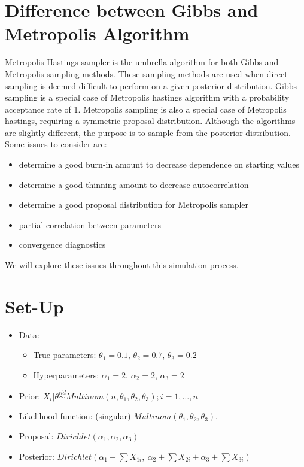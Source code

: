 \documentclass[11pt,a4paper]{article}
\begin{document}

\section*{Difference between Gibbs and Metropolis Algorithm}
Metropolis-Hastings sampler is the umbrella algorithm for both Gibbs and Metropolis sampling methods. These sampling methods are used when direct sampling is deemed difficult to perform on a given posterior distribution. Gibbs sampling is a special case of Metropolis hastings algorithm with a probability acceptance rate of 1. Metropolis sampling is also a special case of Metropolis hastings, requiring a symmetric proposal distribution. Although the algorithms are slightly different, the purpose is to sample from the posterior distribution. 
\newline
Some issues to consider are: 
 
\begin{itemize}
 \item determine a good burn-in amount to decrease dependence on starting values  
 \item determine a good thinning amount to decrease autocorrelation
 \item determine a good proposal distribution for Metropolis sampler
 \item partial correlation between parameters
 \item convergence diagnostics
\end{itemize}
 
We will explore these issues throughout this simulation process.	


\section*{Set-Up}
\begin{itemize}
	\item Data: 
	\begin{itemize}
		\item True parameters: $\theta_{1} = 0.1$, $\theta_{2} = 0.7$, $\theta_{3} = 0.2$
		\item Hyperparameters: $\alpha_{1} = 2$, $\alpha_{2} = 2$, $\alpha_{3} = 2$ 
	\end{itemize}
	\item Prior: $X_{i} | \theta \overset{iid}{\sim} Multinom(n, \theta_{1}, \theta_{2}, \theta_{3}); i = 1, \dots, n$
	\item Likelihood function: (singular) $Multinom(\theta_{1},\theta_{2},\theta_{3})$.
	\item Proposal: $Dirichlet(\alpha_{1}, \alpha_{2}, \alpha_{3})$
	\item Posterior: $Dirichlet(\alpha_{1}+\sum{X_{1i}}, \ \alpha_{2}+\sum{X_{2i}} + \alpha_{3}+\sum{X_{3i}})$
\end{itemize}
\end{document}
